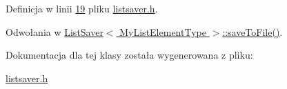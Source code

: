 Definicja w linii \hyperlink{listsaver_8h_source_l00019}{19} pliku \hyperlink{listsaver_8h_source}{listsaver.\-h}.



Odwołania w \hyperlink{listsaver_8h_source_l00032}{List\-Saver$<$ My\-List\-Element\-Type $>$\-::save\-To\-File()}.



Dokumentacja dla tej klasy została wygenerowana z pliku\-:\begin{DoxyCompactItemize}
\item 
\hyperlink{listsaver_8h}{listsaver.\-h}\end{DoxyCompactItemize}
